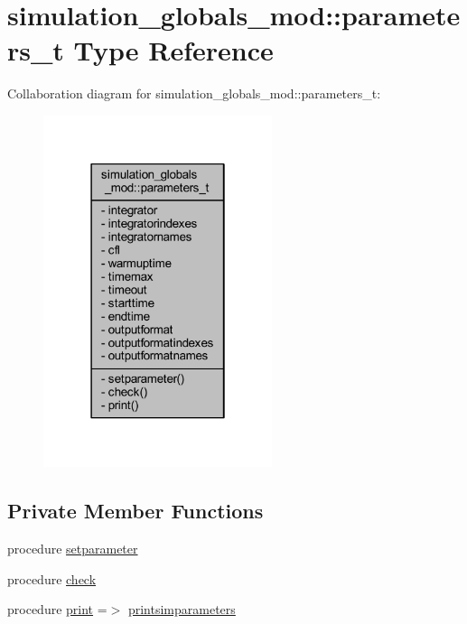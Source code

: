 \hypertarget{structsimulation__globals__mod_1_1parameters__t}{}\section{simulation\+\_\+globals\+\_\+mod\+:\+:parameters\+\_\+t Type Reference}
\label{structsimulation__globals__mod_1_1parameters__t}


Collaboration diagram for simulation\+\_\+globals\+\_\+mod\+:\+:parameters\+\_\+t\+:\nopagebreak
\begin{figure}[H]
\begin{center}
\leavevmode
\includegraphics[width=190pt]{structsimulation__globals__mod_1_1parameters__t__coll__graph}
\end{center}
\end{figure}
\subsection*{Private Member Functions}
\begin{DoxyCompactItemize}
\item 
procedure \mbox{\hyperlink{structsimulation__globals__mod_1_1parameters__t_ab4df8a29214aa31b554483bb8c07004c}{setparameter}}
\item 
procedure \mbox{\hyperlink{structsimulation__globals__mod_1_1parameters__t_ab0dc483d1a0d000e43726c19c892a65d}{check}}
\item 
procedure \mbox{\hyperlink{structsimulation__globals__mod_1_1parameters__t_a220b7b25f77a4e33694055d5427a30dd}{print}} =$>$ \mbox{\hyperlink{namespacesimulation__globals__mod_a97c04d0289a9f2d004a9329cb7ab16f0}{printsimparameters}}
\end{DoxyCompactItemize}
